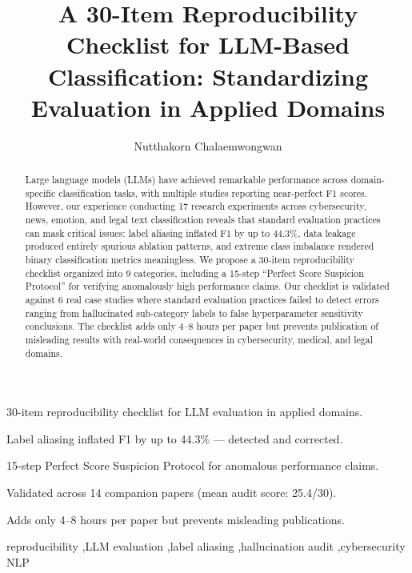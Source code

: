 \documentclass[review,3p]{elsarticle}
\begin{document}
\begin{frontmatter}

\title{A 30-Item Reproducibility Checklist for LLM-Based Classification: Standardizing Evaluation in Applied Domains}

\author[kmitl]{Nutthakorn Chalaemwongwan}
\address[kmitl]{Department of Computer Engineering, KOSEN-KMITL, King Mongkut's Institute of Technology Ladkrabang, Bangkok, Thailand}

\begin{highlights}
\item 30-item reproducibility checklist for LLM evaluation in applied domains.
\item Label aliasing inflated F1 by up to 44.3\% --- detected and corrected.
\item 15-step Perfect Score Suspicion Protocol for anomalous performance claims.
\item Validated across 14 companion papers (mean audit score: 25.4/30).
\item Adds only 4--8 hours per paper but prevents misleading publications.
\end{highlights}

\begin{abstract}
Large language models (LLMs) have achieved remarkable performance across domain-specific classification tasks, with multiple studies reporting near-perfect F1 scores. However, our experience conducting 17 research experiments across cybersecurity, news, emotion, and legal text classification reveals that standard evaluation practices can mask critical issues: label aliasing inflated F1 by up to 44.3\%, data leakage produced entirely spurious ablation patterns, and extreme class imbalance rendered binary classification metrics meaningless. We propose a 30-item reproducibility checklist organized into 9 categories, including a 15-step ``Perfect Score Suspicion Protocol'' for verifying anomalously high performance claims. Our checklist is validated against 6 real case studies where standard evaluation practices failed to detect errors ranging from hallucinated sub-category labels to false hyperparameter sensitivity conclusions. The checklist adds only 4--8 hours per paper but prevents publication of misleading results with real-world consequences in cybersecurity, medical, and legal domains.
\end{abstract}

\begin{keyword}
reproducibility \sep LLM evaluation \sep label aliasing \sep hallucination audit \sep cybersecurity NLP
\end{keyword}

\end{frontmatter}
\end{document}
